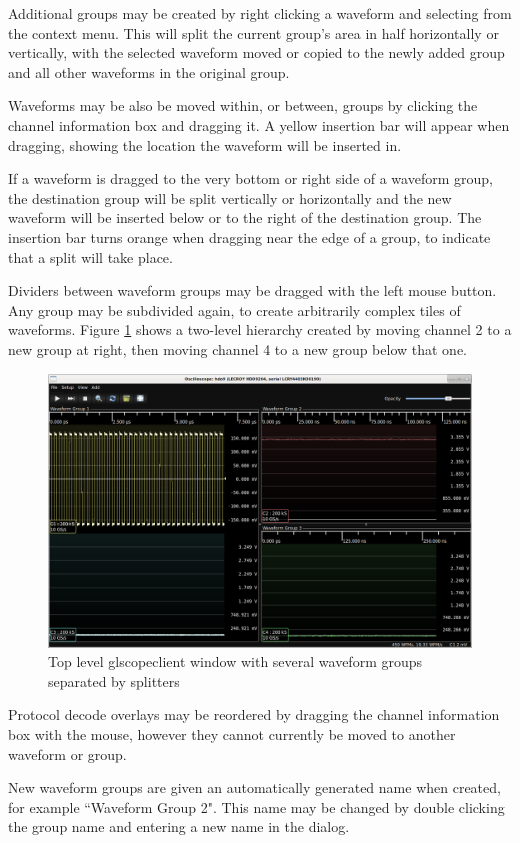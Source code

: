 Additional groups may be created by right clicking a waveform and selecting  from the context menu. This will split the current group's area in half horizontally or
vertically, with the selected waveform moved or copied to the newly added group and all other waveforms in the original
group.

Waveforms may be also be moved within, or between, groups by clicking the channel information box and dragging it. A
yellow insertion bar will appear when dragging, showing the location the waveform will be inserted in.

If a waveform is dragged to the very bottom or right side of a waveform group, the destination group will be split
vertically or horizontally and the new waveform will be inserted below or to the right of the destination group. The
insertion bar turns orange when dragging near the edge of a group, to indicate that a split will take place.

Dividers between waveform groups may be dragged with the left mouse button. Any group may be subdivided again, to
create arbitrarily complex tiles of waveforms. Figure \ref{multiple-groups} shows a two-level hierarchy created by
moving channel 2 to a new group at right, then moving channel 4 to a new group below that one.

\begin{figure}[h]
\centering
\includegraphics[width=14cm]{images/multiple-groups.png}
\caption{Top level glscopeclient window with several waveform groups separated by splitters}
\label{multiple-groups}
\end{figure}

Protocol decode overlays may be reordered by dragging the channel information box with the mouse, however they cannot
currently be moved to another waveform or group.

New waveform groups are given an automatically generated name when created, for example ``Waveform Group 2". This name
may be changed by double clicking the group name and entering a new name in the dialog.
